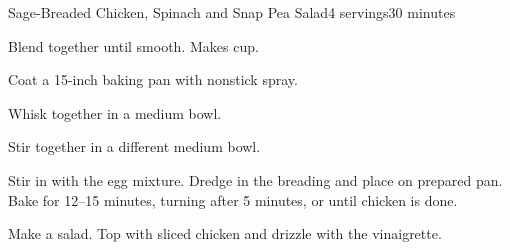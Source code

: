 \documentclass[../Cookbook.tex]{subfiles}
\begin{document}
\begin{recipe}{Sage-Breaded Chicken, Spinach and Snap Pea Salad}{4 servings}{30 minutes}

Blend together until smooth. Makes  cup.

 Coat a 15-inch baking pan with nonstick spray.

Whisk together in a medium bowl.

Stir together in a different medium bowl.

Stir in with the egg mixture. Dredge in the breading and place on prepared pan. Bake for 12--15 minutes, turning after 5 minutes, or until chicken is done.

Make a salad. Top with sliced chicken and drizzle with the vinaigrette.

\end{recipe}
\end{document}
